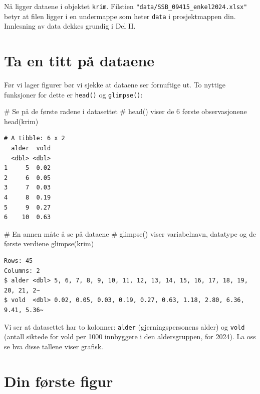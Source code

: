 \documentclass[
  norsk,
  letterpaper,
  DIV=11,
  numbers=noendperiod]{scrreprt}
\newenvironment{Shaded}{\begin{snugshade}}{\end{snugshade}}
\newcommand{\CommentTok}[1]{\textcolor[rgb]{0.37,0.37,0.37}{#1}}
\newcommand{\FunctionTok}[1]{\textcolor[rgb]{0.28,0.35,0.67}{#1}}
\newcommand{\NormalTok}[1]{\textcolor[rgb]{0.00,0.23,0.31}{#1}}
\theoremstyle{definition}
\theoremstyle{remark}
\begin{document}
Nå ligger dataene i objektet \texttt{krim}. Filstien
\texttt{"data/SSB\_09415\_enkel2024.xlsx"} betyr at filen ligger i en
undermappe som heter \texttt{data} i prosjektmappen din. Innlesning av
data dekkes grundig i Del II.

\section{Ta en titt på dataene}\label{ta-en-titt-puxe5-dataene}

Før vi lager figurer bør vi sjekke at dataene ser fornuftige ut. To
nyttige funksjoner for dette er \texttt{head()} og \texttt{glimpse()}:

\begin{Shaded}
\begin{Highlighting}[]
\CommentTok{\# Se på de første radene i datasettet}
\CommentTok{\# head() viser de 6 første observasjonene}
\FunctionTok{head}\NormalTok{(krim)}
\end{Highlighting}
\end{Shaded}

\begin{verbatim}
# A tibble: 6 x 2
  alder  vold
  <dbl> <dbl>
1     5  0.02
2     6  0.05
3     7  0.03
4     8  0.19
5     9  0.27
6    10  0.63
\end{verbatim}

\begin{Shaded}
\begin{Highlighting}[]
\CommentTok{\# En annen måte å se på dataene}
\CommentTok{\# glimpse() viser variabelnavn, datatype og de første verdiene}
\FunctionTok{glimpse}\NormalTok{(krim)}
\end{Highlighting}
\end{Shaded}

\begin{verbatim}
Rows: 45
Columns: 2
$ alder <dbl> 5, 6, 7, 8, 9, 10, 11, 12, 13, 14, 15, 16, 17, 18, 19, 20, 21, 2~
$ vold  <dbl> 0.02, 0.05, 0.03, 0.19, 0.27, 0.63, 1.18, 2.80, 6.36, 9.41, 5.36~
\end{verbatim}

Vi ser at datasettet har to kolonner: \texttt{alder} (gjerningspersonens
alder) og \texttt{vold} (antall siktede for vold per 1000 innbyggere i
den aldersgruppen, for 2024). La oss se hva disse tallene viser grafisk.

\section{Din første figur}\label{din-fuxf8rste-figur}
\end{document}
